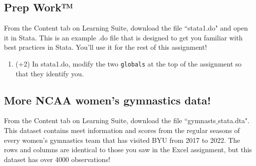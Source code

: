 \documentclass[12pt, oneside]{article}
\begin{document}
\subsection{Prep Work™}
\item   From the Content tab on Learning Suite, download the file ``stata1.do" and open it in Stata. This is an example .do file that is designed to get you familiar with best practices in Stata. You'll use it for the rest of this assignment!
\begin{enumerate}
\item   (+2)    In stata1.do, modify the two \texttt{globals} at the top of the assignment so that they identify you.
\end{enumerate}

\subsection{More NCAA women's gymnastics data!}
From the Content tab on Learning Suite, download the file ``gymnasts$\_$stata.dta". This dataset contains meet information and scores from the regular seasons of every women's gymnastics team that has visited BYU from 2017 to 2022. The rows and columns are identical to those you saw in the Excel assignment, but this dataset has over 4000 observations!
\end{document}
